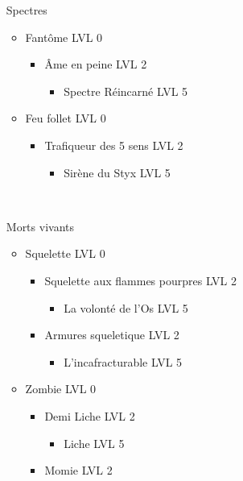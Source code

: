 \begin{itemize}
	\item[Spectres]~\\
		\begin{itemize}
			\item Fantôme LVL 0
				\begin{itemize}
					\item Âme en peine LVL 2
						\begin{itemize}
							\item Spectre Réincarné LVL 5
						\end{itemize}
				\end{itemize}
			\item Feu follet LVL 0
				\begin{itemize}
					\item Trafiqueur des 5 sens LVL 2
						\begin{itemize}
							\item Sirène du Styx LVL 5
						\end{itemize}
				\end{itemize}
		\end{itemize}~\\
	\item[Morts vivants] ~\\
		\begin{itemize}
			\item Squelette LVL 0
				\begin{itemize}
					\item Squelette aux flammes pourpres LVL 2
						\begin{itemize}
							\item La volonté de l'Os LVL 5
						\end{itemize}
					\item Armures squeletique LVL 2
						\begin{itemize}
							\item L'incafracturable LVL 5
						\end{itemize}
				\end{itemize}
			\item Zombie LVL 0
				\begin{itemize}
					\item Demi Liche LVL 2
						\begin{itemize}
							\item Liche LVL 5
						\end{itemize}
					\item Momie LVL 2
						\begin{itemize}

\end{itemize}
\end{itemize}
\end{itemize}
\end{itemize}
